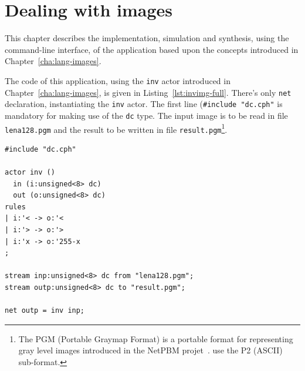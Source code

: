 
\chapter{Dealing with images}
\label{cha:cl-images}

This chapter describes the implementation, simulation and synthesis, using the command-line
interface, of the application based upon the concepts introduced in Chapter~\ref{cha:lang-images}. 

\medskip The code of this application, using the \texttt{inv} actor introduced in
Chapter~\ref{cha:lang-images}, is given in Listing~\ref{lst:invimg-full}. There's only \verb|net|
declaration, instantiating the \verb|inv| actor. The first line (\verb|#include "dc.cph"| is
mandatory for making use of the \verb|dc| type. The input image is to be read in file
\verb|lena128.pgm| and the result to be written in file \verb|result.pgm|\footnote{The PGM (Portable
  Graymap Format) is a portable format for representing gray level images introduced in the NetPBM
  projet~\cite{PGM}. \caph use the P2 (ASCII) sub-format.}.

\begin{lstlisting}[style=CaphStyle,caption={Complete CAPH source code for 
    an application computing negative images},label={lst:invimg-full}]
#include "dc.cph"

actor inv ()
  in (i:unsigned<8> dc)
  out (o:unsigned<8> dc)
rules
| i:'< -> o:'<
| i:'> -> o:'>
| i:'x -> o:'255-x
;

stream inp:unsigned<8> dc from "lena128.pgm";
stream outp:unsigned<8> dc to "result.pgm";

net outp = inv inp;\end{lstlisting}

